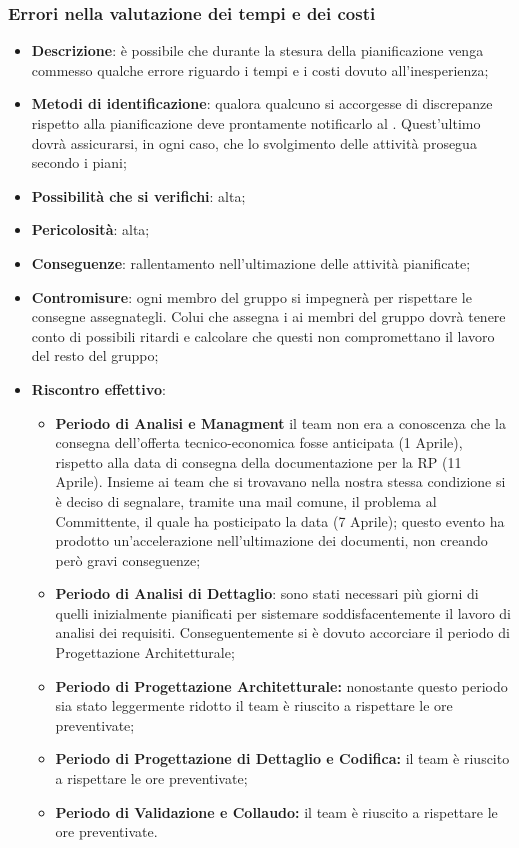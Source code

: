 		\subsubsection{Errori nella valutazione dei tempi e dei costi}
		\begin{itemize}
			\item \textbf{Descrizione}: è possibile che durante la stesura della pianificazione venga commesso qualche errore riguardo i tempi e i costi dovuto all'inesperienza;
			\item \textbf{Metodi di identificazione}: qualora qualcuno si accorgesse di discrepanze rispetto alla pianificazione deve prontamente notificarlo al \RES{}. Quest'ultimo dovrà assicurarsi, in ogni caso, che lo svolgimento delle attività prosegua secondo i piani;
			\item \textbf{Possibilità che si verifichi}: alta;
			\item \textbf{Pericolosità}: alta;
			\item \textbf{Conseguenze}: rallentamento nell'ultimazione delle attività pianificate;
			\item \textbf{Contromisure}: ogni membro del gruppo si impegnerà per rispettare le consegne assegnategli. Colui che assegna i  ai membri del gruppo dovrà tenere conto di possibili ritardi e calcolare che questi non compromettano il lavoro del resto del gruppo;
			\item \textbf{Riscontro effettivo}:
			\begin{itemize}
				 \item \textbf{Periodo di Analisi e Managment} il team non era a conoscenza che la consegna dell'offerta tecnico-economica fosse anticipata (1 Aprile), rispetto alla data di consegna della documentazione per la RP (11 Aprile). Insieme ai team che si trovavano nella nostra stessa condizione si è deciso di segnalare, tramite una mail comune, il problema al Committente, il quale ha posticipato la data (7 Aprile); questo evento ha prodotto un'accelerazione nell'ultimazione dei documenti, non creando però gravi conseguenze;
				 \item \textbf{Periodo di Analisi di Dettaglio}: sono stati necessari più giorni di quelli inizialmente pianificati per sistemare soddisfacentemente il lavoro di analisi dei requisiti. Conseguentemente si è dovuto accorciare il periodo di Progettazione Architetturale;
				 \item \textbf{Periodo di Progettazione Architetturale:} nonostante questo periodo sia stato leggermente ridotto il team è riuscito a rispettare le ore preventivate;
             \item \textbf{Periodo di Progettazione di Dettaglio e Codifica:} il team è riuscito a rispettare le ore preventivate;
             \item \textbf{Periodo di Validazione e Collaudo:} il team è riuscito a rispettare le ore preventivate.
			\end{itemize}
		\end{itemize}


